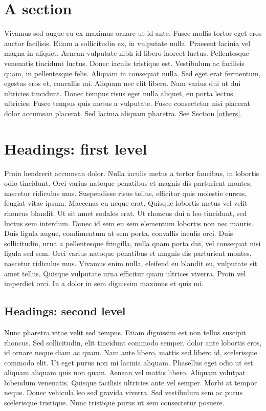 \documentclass{article}
\begin{document}
\section{A section}
\label{gen_inst}

Vivamus sed augue eu ex maximus ornare ut id ante. Fusce mollis tortor eget eros auctor facilisis. Etiam a sollicitudin ex, in vulputate nulla. Praesent lacinia vel magna in aliquet. Aenean vulputate nibh id libero laoreet luctus. Pellentesque venenatis tincidunt luctus. Donec iaculis tristique est. Vestibulum ac facilisis quam, in pellentesque felis. Aliquam in consequat nulla. Sed eget erat fermentum, egestas eros et, convallis mi. Aliquam nec elit libero. Nam varius dui ut dui ultricies tincidunt. Donec tempus risus eget nulla aliquet, eu porta lectus ultricies. Fusce tempus quis metus a vulputate. Fusce consectetur nisi placerat dolor accumsan placerat. Sed lacinia aliquam pharetra. See Section \ref{others}.

\section{Headings: first level}
\label{headings}
Proin hendrerit accumsan dolor. Nulla iaculis metus a tortor faucibus, in lobortis odio tincidunt. Orci varius natoque penatibus et magnis dis parturient montes, nascetur ridiculus mus. Suspendisse risus tellus, efficitur quis molestie cursus, feugiat vitae ipsum. Maecenas eu neque erat. Quisque lobortis metus vel velit rhoncus blandit. Ut sit amet sodales erat. Ut rhoncus dui a leo tincidunt, sed luctus sem interdum. Donec id sem eu sem elementum lobortis non nec mauris. Duis ligula augue, condimentum at sem porta, convallis iaculis orci. Duis sollicitudin, urna a pellentesque fringilla, nulla quam porta dui, vel consequat nisi ligula sed sem. Orci varius natoque penatibus et magnis dis parturient montes, nascetur ridiculus mus. Vivamus enim nulla, eleifend eu blandit eu, vulputate sit amet tellus. Quisque vulputate urna efficitur quam ultrices viverra. Proin vel imperdiet orci. In a dolor in sem dignissim maximus et quis mi.

\subsection{Headings: second level}

Nunc pharetra vitae velit sed tempus. Etiam dignissim est non tellus suscipit rhoncus. Sed sollicitudin, elit tincidunt commodo semper, dolor ante lobortis eros, id ornare neque diam ac quam. Nam ante libero, mattis sed libero id, scelerisque commodo elit. Ut eget purus non mi lacinia aliquam. Phasellus eget odio ut est aliquam aliquam quis non quam. Aenean vel mattis libero. Aliquam volutpat bibendum venenatis. Quisque facilisis ultricies ante vel semper. Morbi at tempor neque. Donec vehicula leo sed gravida viverra. Sed vestibulum sem ac purus scelerisque tristique. Nunc tristique purus ut sem consectetur posuere.
\end{document}
